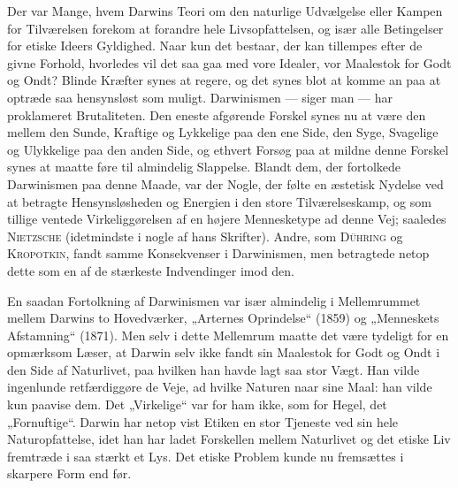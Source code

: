 \documentclass[12pt,a4paper,openany]{book}
\newcommand{\opage}[1]{\marginnote{\footnotesize\textit{[#1]}}}
\begin{document}
Der var Mange, hvem Darwins Teori om den naturlige Udvælgelse
eller Kampen for Tilværelsen forekom at forandre
hele Livsopfattelsen, og især alle Betingelser for etiske Ideers
Gyldighed. Naar kun det bestaar, der kan tillempes efter de
givne Forhold, hvorledes vil det saa gaa med vore Idealer, vor
Maalestok for Godt og Ondt? Blinde Kræfter synes at regere,
og det synes blot at komme an paa at optræde saa hensynsløst
som muligt. Darwinismen --- siger man --- har proklameret
Brutaliteten. Den eneste afgørende Forskel synes nu at være
den mellem den Sunde, Kraftige og Lykkelige paa den ene
\setcounter{footnote}{0}%
\opage{220}Side, den Syge, Svagelige og Ulykkelige paa den anden Side,
og ethvert Forsøg paa at mildne denne Forskel synes at maatte
føre til almindelig Slappelse. Blandt dem, der fortolkede Darwinismen
paa denne Maade, var der Nogle, der følte en æstetisk
Nydelse ved at betragte Hensynsløsheden og Energien i
den store Tilværelseskamp, og som tillige ventede Virkeliggørelsen
af en højere Mennesketype ad denne Vej; saaledes
\textsc{Nietzsche} (idetmindste i nogle af hans Skrifter). Andre, som
\textsc{Dühring} og \textsc{Kropotkin}, fandt samme Konsekvenser i Darwinismen,
men betragtede netop dette som en af de stærkeste
Indvendinger imod den.

En saadan Fortolkning af Darwinismen var især almindelig
i Mellemrummet mellem Darwins to Hovedværker, „Arternes
Oprindelse“ (1859) og „Menneskets Afstamning“ (1871). Men
selv i dette Mellemrum maatte det være tydeligt for en opmærksom
Læser, at Darwin selv ikke fandt sin Maalestok for
Godt og Ondt i den Side af Naturlivet, paa hvilken han havde
lagt saa stor Vægt. Han vilde ingenlunde retfærdiggøre de
Veje, ad hvilke Naturen naar sine Maal: han vilde kun paavise
dem. Det „Virkelige“ var for ham ikke, som for Hegel, det
„Fornuftige“. Darwin har netop vist Etiken en stor Tjeneste
ved sin hele Naturopfattelse, idet han har ladet Forskellen
mellem Naturlivet og det etiske Liv fremtræde i saa stærkt et
Lys. Det etiske Problem kunde nu fremsættes i skarpere Form
end før.
\end{document}
